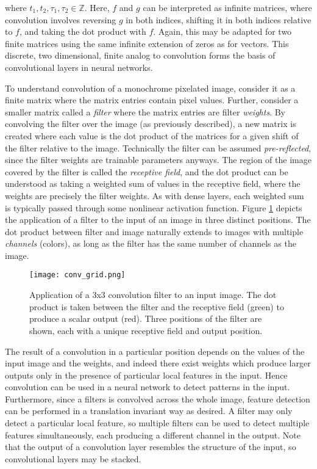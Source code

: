 \noindent
where $t_1, t_2, \tau_1, \tau_2 \in \mathbb{Z}$.
Here, $f$ and $g$ can be interpreted as infinite matrices, where convolution involves reversing $g$ in both indices, shifting it in both indices relative to $f$, and taking the dot product with $f$.
Again, this may be adapted for two finite matrices using the same infinite extension of zeros as for vectors.
This discrete, two dimensional, finite analog to convolution forms the basis of convolutional layers in neural networks.

To understand convolution of a monochrome pixelated image, consider it as a finite matrix where the matrix entries contain pixel values.
Further, consider a smaller matrix called a \textit{filter} where the matrix entries are filter \textit{weights}.
By convolving the filter over the image (as previously described), a new matrix is created where each value is the dot product of the matrices for a given shift of the filter relative to the image.
Technically the filter can be assumed \textit{pre-reflected}, since the filter weights are trainable parameters anyways.
The region of the image covered by the filter is called the \textit{receptive field}, and the dot product can be understood as taking a weighted sum of values in the receptive field, where the weights are precisely the filter weights.
As with dense layers, each weighted sum is typically passed through some nonlinear activation function.
Figure \ref{fig:convolutionallayer} depicts the application of a filter to the input of an image in three distinct positions.
The dot product between filter and image naturally extends to images with multiple \textit{channels} (colors), as long as the filter has the same number of channels as the image.

\begin{figure}
	\centering
	\texttt{[image: conv\_grid.png]}
	\caption{Application of a 3x3 convolution filter to an input image. The dot product is taken between the filter and the receptive field (green) to produce a scalar output (red). Three positions of the filter are shown, each with a unique receptive field and output position.}
	\label{fig:convolutionallayer}
\end{figure}

The result of a convolution in a particular position depends on the values of the input image and the weights, and indeed there exist weights which produce larger outputs only in the presence of particular local features in the input.
Hence convolution can be used in a neural network to detect patterns in the input.
Furthermore, since a filters is convolved across the whole image, feature detection can be performed in a translation invariant way as desired. 
A filter may only detect a particular local feature, so multiple filters can be used to detect multiple features simultaneously, each producing a different channel in the output.
Note that the output of a convolution layer resembles the structure of the input, so convolutional layers may be stacked.

